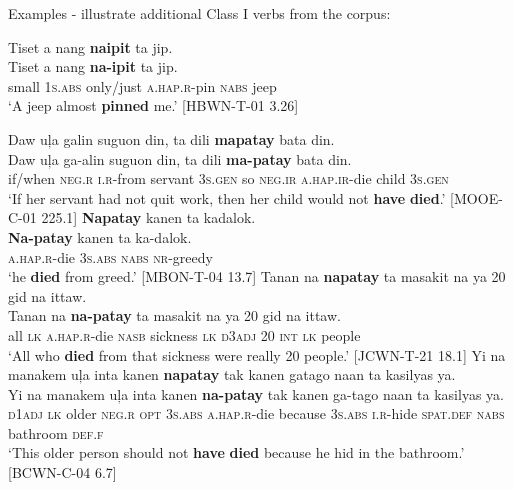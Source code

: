 Examples - illustrate additional Class I verbs from the corpus:


\ea
\label{bkm:Ref440375076}
Tiset  a  nang  \textbf{naipit}  ta  jip. \\\smallskip
\gll Tiset  a  nang  \textbf{na-ipit}  ta  jip. \\
small  1\textsc{s.abs} only/just  \textsc{a.hap.r}-pin  \textsc{nabs}  jeep \\
\glt ‘A jeep almost \textbf{pinned} me.’ [HBWN-T-01 3.26]
\z

\newpage

\ea
Daw  uļa  galin  suguon  din,  ta  dili  \textbf{mapatay}  bata  din. \\\smallskip
\gll Daw  uļa  ga-alin  suguon  din,  ta  dili  \textbf{ma-patay}  bata  din. \\
if/when  \textsc{neg.r}  \textsc{i.r}-from  servant  3\textsc{s.gen}  so  \textsc{neg.ir}  \textsc{a.hap.ir}-die  child  3\textsc{s.gen} \\
\glt ‘If her servant had not quit work, then her child would not \textbf{have} \textbf{died}.’ [MOOE-C-01 225.1]
\z
\ea
\textbf{Napatay}  kanen  ta  kadalok. \\\smallskip
\gll \textbf{Na-patay}  kanen  ta  ka-dalok. \\
\textsc{a.hap.r}-die  3\textsc{s.abs}  \textsc{nabs}  \textsc{nr}-greedy \\
\glt ‘he \textbf{died} from greed.’ [MBON-T-04 13.7]
\z
\ea
Tanan  na  \textbf{napatay}  ta  masakit  na ya  20  gid  na  ittaw. \\\smallskip
\gll Tanan  na  \textbf{na-patay}  ta  masakit  na ya  20  gid  na  ittaw. \\
all  \textsc{lk}  \textsc{a.hap.r}-die  \textsc{nasb}  sickness  \textsc{lk} \textsc{d3adj}  20  \textsc{int}  \textsc{lk}  people \\
\glt ‘All who \textbf{died} from that sickness were really 20 people.’ [JCWN-T-21 18.1]
\z
\ea
Yi  na  manakem  uļa  inta  kanen  \textbf{napatay}  tak  kanen  gatago naan  ta  kasilyas  ya. \\\smallskip
\gll Yi  na  manakem  uļa  inta  kanen  \textbf{na-patay}  tak  kanen  ga-tago naan  ta  kasilyas  ya. \\
\textsc{d1adj}  \textsc{lk}  older  \textsc{neg.r}  \textsc{opt}  3\textsc{s.abs}  \textsc{a.hap.r}-die  because  3\textsc{s.abs}  \textsc{i.r}-hide \textsc{spat.def}  \textsc{nabs}  bathroom  \textsc{def.f} \\
\glt ‘This older person should not \textbf{have} \textbf{died} because he hid in the bathroom.’ [BCWN-C-04 6.7]
\z

